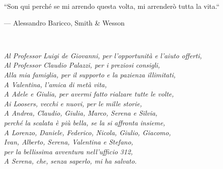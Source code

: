 
\begin{dedication} 
\small	
\epigraph{``Son qui perché se mi arrendo questa volta, mi arrenderò tutta la vita.``}{--- \textup{Alessandro Baricco}, Smith \& Wesson}
~\\[0.7in]
\begin{flushright}
	\textit{
	Al Professor Luigi de Giovanni, per l'opportunità e l'aiuto offerti, \\
	Al Professor Claudio Palazzi, per i preziosi consigli, \\
	Alla mia famiglia, per il supporto e la pazienza illimitati,\\
	A Valentina, l'amica di metà vita,\\
	A Adele e Giulia, per avermi fatto rialzare tutte le volte, \\
	Ai Loosers, vecchi e nuovi, per le mille storie, \\
	A Andrea, Claudio, Giulia, Marco, Serena e Silvia,\\ perché la scalata è più bella, se la si affronta insieme, \\
	A Lorenzo, Daniele, Federico, Nicola, Giulio, Giacomo, \\Ivan, Alberto, Serena, Valentina e Stefano, \\per la bellissima avventura nell'ufficio 312,
	\\[0.5in]
	A Serena, che, senza saperlo, mi ha salvato.\\
	}
	
	

\end{flushright}


\end{dedication}

